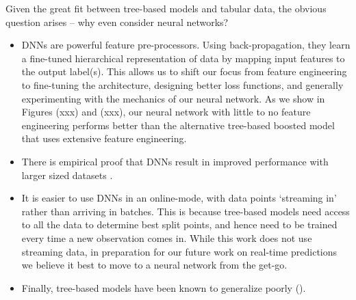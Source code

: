 Given the great fit between tree-based models and tabular data, the obvious question arises -- why even consider neural networks?
\begin{itemize}
    \item DNNs are powerful feature pre-processors. Using back-propagation, they learn a fine-tuned hierarchical representation of data by mapping input features to the output label(s). This allows us to shift our focus from feature engineering to fine-tuning the architecture, designing better loss functions, and generally experimenting with the mechanics of our neural network. As we show in Figures (xxx) and (xxx), our neural network with little to no feature engineering performs better than the alternative tree-based boosted model that uses extensive feature engineering.
    \item There is empirical proof that DNNs result in improved performance with larger sized datasets \citep{airbnb}.
    \item %
    It is easier to use DNNs in an online-mode, with data points `streaming in' rather than arriving in batches. This is because tree-based models need access to all the data to determine best split points, and hence need to be trained every time a new observation comes in. While this work does not use streaming data, in preparation for our future work on real-time predictions we believe it best to move to a neural network from the get-go.
    \item Finally, tree-based models have been known to generalize poorly ().
\end{itemize}
%
\fi




